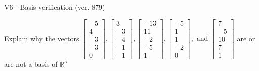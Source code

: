 \begin{exercise}
  \begin{exerciseTitle}V6 - Basis verification (ver. 879)\end{exerciseTitle}
  \begin{exerciseStatement}
    Explain why the vectors \(\left[\begin{array}{r}
-5 \\
4 \\
-3 \\
-3 \\
0
\end{array}\right] , \left[\begin{array}{r}
3 \\
-3 \\
-4 \\
-1 \\
-1
\end{array}\right] , \left[\begin{array}{r}
-13 \\
11 \\
-2 \\
-5 \\
1
\end{array}\right] , \left[\begin{array}{r}
-5 \\
1 \\
1 \\
-2 \\
0
\end{array}\right] , \text{ and } \left[\begin{array}{r}
7 \\
-5 \\
10 \\
7 \\
1
\end{array}\right]\) are or are not a basis of \(\mathbb{R}^5\)	



\end{exerciseStatement}
\end{exercise}
